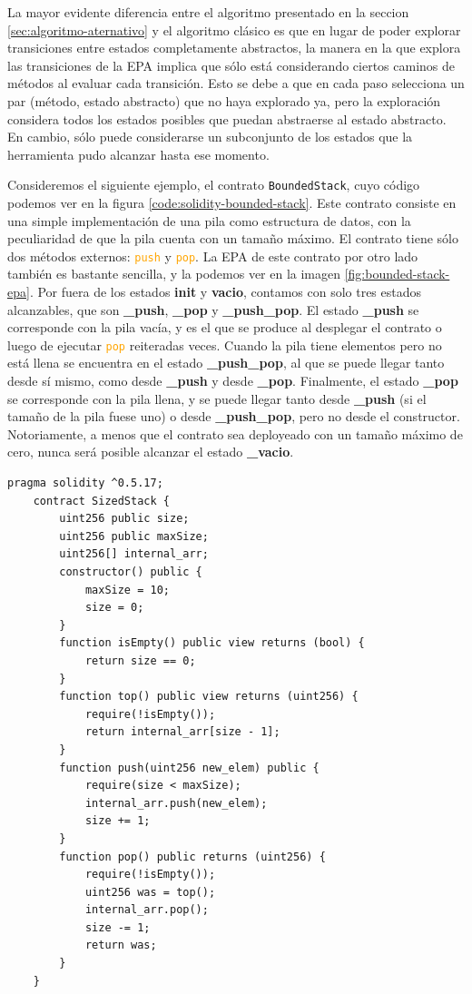 La mayor evidente diferencia entre el algoritmo presentado en la seccion \ref{sec:algoritmo-aternativo} y el algoritmo clásico es que en lugar de poder explorar transiciones entre estados completamente abstractos, la manera en la que explora las transiciones de la EPA implica que sólo está considerando ciertos caminos de métodos al evaluar cada transición.
Esto se debe a que en cada paso selecciona un par (método, estado abstracto) que no haya explorado ya, pero la exploración considera todos los estados posibles que puedan abstraerse al estado abstracto.
En cambio, sólo puede considerarse un subconjunto de los estados que la herramienta pudo alcanzar hasta ese momento.

Consideremos el siguiente ejemplo, el contrato \texttt{BoundedStack}, cuyo código podemos ver en la figura \ref{code:solidity-bounded-stack}.
Este contrato consiste en una simple implementación de una pila como estructura de datos, con la peculiaridad de que la pila cuenta con un tamaño máximo.
El contrato tiene sólo dos métodos externos: \textcolor{orange}{\texttt{push}} y \textcolor{orange}{\texttt{pop}}.
La EPA de este contrato por otro lado también es bastante sencilla, y la podemos ver en la imagen \ref{fig:bounded-stack-epa}.
Por fuera de los estados \textbf{init} y \textbf{vacio}, contamos con solo tres estados alcanzables, que son \textbf{\_push}, \textbf{\_pop} y \textbf{\_push\_pop}.
El estado \textbf{\_push} se corresponde con la pila vacía, y es el que se produce al desplegar el contrato o luego de ejecutar \textcolor{orange}{\texttt{pop}} reiteradas veces.
Cuando la pila tiene elementos pero no está llena se encuentra en el estado \textbf{\_push\_pop}, al que se puede llegar tanto desde sí mismo, como desde \textbf{\_push} y desde \textbf{\_pop}.
Finalmente, el estado \textbf{\_pop} se corresponde con la pila llena, y se puede llegar tanto desde \textbf{\_push} (si el tamaño de la pila fuese uno) o desde \textbf{\_push\_pop}, pero no desde el constructor.
Notoriamente, a menos que el contrato sea deployeado con un tamaño máximo de cero, nunca será posible alcanzar el estado \textbf{\_vacio}.

\begin{lstlisting}[language=Solidity, label={code:solidity-bounded-stack}, caption={Contrato Inteligente \texttt{BoundedStack} en Solidity},captionpos=b]
    pragma solidity ^0.5.17;
    contract SizedStack {
        uint256 public size;
        uint256 public maxSize;
        uint256[] internal_arr;
        constructor() public {
            maxSize = 10;
            size = 0;
        }
        function isEmpty() public view returns (bool) {
            return size == 0;
        }
        function top() public view returns (uint256) {
            require(!isEmpty());
            return internal_arr[size - 1];
        }
        function push(uint256 new_elem) public {
            require(size < maxSize);
            internal_arr.push(new_elem);
            size += 1;
        }
        function pop() public returns (uint256) {
            require(!isEmpty());
            uint256 was = top();
            internal_arr.pop();
            size -= 1;
            return was;
        }
    }
    \end{lstlisting}


